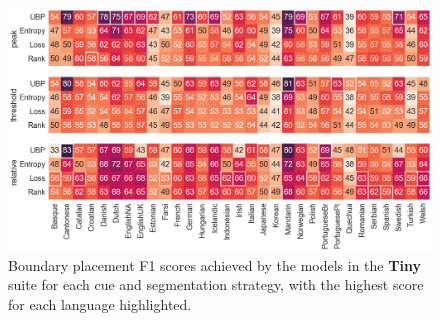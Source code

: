 

\begin{figure}
    \centering
    \includegraphics[width=0.99\linewidth]{Figures/15Phonology/tiny.png}
    \caption{Boundary placement F1 scores achieved by the models in the \textbf{Tiny} suite for each cue and segmentation strategy, with the highest score for each language highlighted.}
    \label{fig:15-tiny}
\end{figure}

